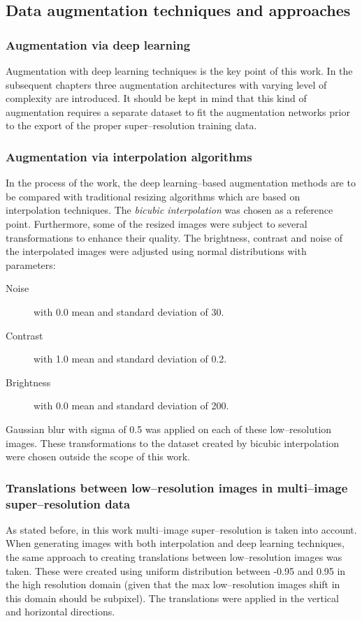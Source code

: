 \subsection{Data augmentation techniques and approaches}
\subsubsection{Augmentation via deep learning}
Augmentation with deep learning techniques is the key point of this work.
In the subsequent chapters three augmentation architectures with varying level of complexity are introduced.
It should be kept in mind that this kind of augmentation requires a separate dataset to fit the augmentation networks prior to the export of the proper super--resolution training data.

\subsubsection{Augmentation via interpolation algorithms}
In the process of the work, the deep learning--based augmentation methods are to be compared with traditional resizing algorithms which are based on interpolation techniques.
The \textit{bicubic interpolation} was chosen as a reference point.
Furthermore, some of the resized images were subject to several transformations to enhance their quality.
The brightness, contrast and noise of the interpolated images were adjusted using normal distributions with parameters:
\begin{description}
	\item[Noise] with 0.0 mean and standard deviation of 30.
	\item[Contrast] with 1.0 mean and standard deviation of 0.2.
	\item[Brightness] with 0.0 mean and standard deviation of 200.
\end{description}
Gaussian blur with sigma of 0.5 was applied on each of these low--resolution images.
These transformations to the dataset created by bicubic interpolation were chosen outside the scope of this work.

\subsubsection{Translations between low--resolution images in multi--image super--resolution data}
As stated before, in this work multi--image super--resolution is taken into account.
When generating images with both interpolation and deep learning techniques, the same approach to creating translations between low--resolution images was taken.
These were created using uniform distribution between -0.95 and 0.95 in the high resolution domain (given that the max low--resolution images shift in this domain should be subpixel).
The translations were applied in the vertical and horizontal directions.

